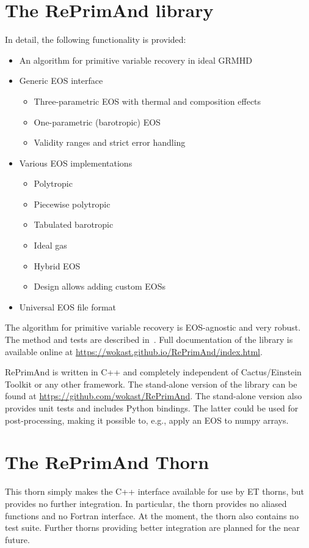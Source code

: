 \section{The RePrimAnd library}
In detail, the following functionality is provided: 
\begin{itemize}
\item An algorithm for primitive variable recovery in ideal GRMHD
\item Generic EOS interface
\begin{itemize}
\item Three-parametric EOS with thermal and composition effects
\item One-parametric (barotropic) EOS
\item Validity ranges and strict error handling
\end{itemize}
\item Various EOS implementations
\begin{itemize}
\item Polytropic
\item Piecewise polytropic
\item Tabulated barotropic
\item Ideal gas
\item Hybrid EOS
\item Design allows adding custom EOSs 
\end{itemize}
\item Universal EOS file format 
\end{itemize}


The algorithm for primitive variable recovery is EOS-agnostic and very robust. 
The method and tests are described in~\cite{RePrimaAnd_PhysRevD.103.023018}. 
Full documentation of the library is available online at
\url{https://wokast.github.io/RePrimAnd/index.html}.

RePrimAnd is written in C++ and completely independent of Cactus/Einstein Toolkit or any other 
framework. The stand-alone version of the library can be found at
\url{https://github.com/wokast/RePrimAnd}.
The stand-alone version also provides unit tests and includes Python bindings. The latter
could be used for post-processing, making it possible to, e.g., apply an EOS to numpy arrays. 

\section{The RePrimAnd Thorn}
This thorn simply makes the C++ interface available for use by ET thorns, but provides no further
integration. In particular, the thorn provides no aliased functions and no Fortran interface.
At the moment, the thorn also contains no test suite.
Further thorns providing better integration are planned for the near future.

